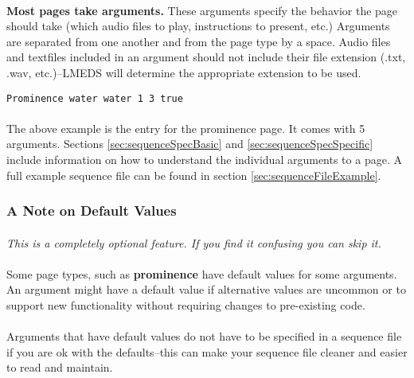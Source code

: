 \paragraph{}
\textbf{Most pages take arguments.}  These arguments specify the behavior the page should take (which audio files to play, instructions to present, etc.)  Arguments are separated from one another and from the page type by a space.  Audio files and textfiles included in an argument should not include their file extension (.txt, .wav, etc.)--LMEDS will determine the appropriate extension to be used.

\begin{lstlisting}
Prominence water water 1 3 true
\end{lstlisting}

\paragraph{}
The above example is the entry for the prominence page.  It comes with 5 arguments.  Sections \ref{sec:sequenceSpecBasic} and \ref{sec:sequenceSpecSpecific} include information on how to understand the individual arguments to a page.  A full example sequence file can be found in section \ref{sec:sequenceFileExample}.


\subsubsection{A Note on Default Values}

\paragraph{}
\textit{This is a completely optional feature.  If you find it confusing you can skip it.}

\paragraph{}
Some page types, such as \textbf{prominence} have default values for some arguments.   An argument might have a default value if alternative values are uncommon or to support new functionality without requiring changes to pre-existing code.

\paragraph{}
Arguments that have default values do not have to be specified in a sequence file if you are ok with the defaults--this can make your sequence file cleaner and easier to read and maintain.

